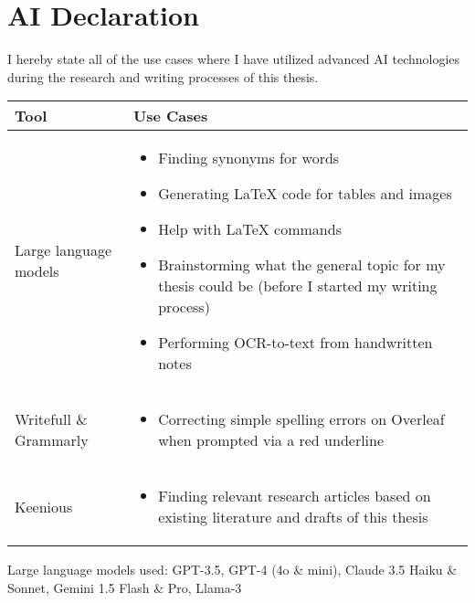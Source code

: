 


\chapter*{AI Declaration\label{extra:declaration}}
\begin{comment}
\end{comment}


I hereby state all of the use cases where I have utilized advanced AI technologies during the research and writing processes of this thesis.

\begin{table}[h]  
  \centering  
  \renewcommand{\arraystretch}{1.5} %
  \renewcommand{\labelitemi}{--}     %

  \begin{tabular}{>{\raggedright\arraybackslash}p{} >{\raggedright\arraybackslash}p{}}  
    \toprule
    \textbf{Tool} & \textbf{Use Cases} \\
    \midrule  
    Large language models &   
    \begin{itemize}  
      \item Finding synonyms for words
      \item Generating LaTeX code for tables and images  
      \item Help with LaTeX commands
      \item Brainstorming what the general topic for my thesis could be (before I started my writing process)
      \item Performing OCR-to-text from handwritten notes
      
    \end{itemize} \\
    \midrule  
    Writefull \& Grammarly &   
    \begin{itemize}  
      \item Correcting simple spelling errors on Overleaf when prompted via a red underline
    \end{itemize} \\
    \midrule  
    Keenious &   
    \begin{itemize}  
      \item Finding relevant research articles based on existing literature and drafts of this thesis
    \end{itemize} \\
    \bottomrule  
  \end{tabular}  
  \label{table:declaration}  
\end{table}  

Large language models used: GPT-3.5, GPT-4 (4o \& mini), Claude 3.5 Haiku \& Sonnet, Gemini 1.5 Flash \& Pro, Llama-3
